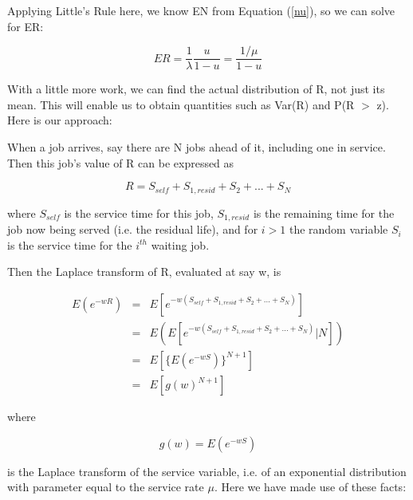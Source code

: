 Applying Little's Rule here, we know EN from Equation (\ref{nu}), so we
can solve for ER:

\begin{equation}
\label{meanres1}
ER = \frac{1}{\lambda} \frac{u}{1-u} = \frac{1/\mu}{1-u}
\end{equation}  

With a little more work, we can find the actual distribution of R, not
just its mean.  This will enable us to obtain quantities such as Var(R)
and P(R $>$ z).  Here is our approach:

When a job arrives, say there are N jobs ahead of it, including one in
service.  Then this job's value of R can be expressed as

\begin{equation}
\label{remaining}
R = S_{self} + S_{1,resid} + S_{2} + ... + S_{N}
\end{equation}

where $S_{self}$ is the service time for this job, $S_{1,resid}$ is the
remaining time for the job now being served (i.e. the residual life),
and for $i > 1$ the random variable $S_{i}$ is the service time for the
$i^{th}$ waiting job.

Then the Laplace transform of R, evaluated at say w, is

\begin{eqnarray}
\label{rlt}
E(e^{-wR}) &=& E[e^{-w(S_{self}+S_{1,resid}+S_{2}+...+S_{N})}] \\
&=& E \left ( 
E[e^{-w(S_{self}+S_{1,resid}+S_{2}+...+S_{N})} | N]
\right ) \\
&=& E[\{E(e^{-wS})\}^{N+1}] \\
&=& E[g(w)^{N+1}] \label{heyitsgeom}
\end{eqnarray}

where 

\begin{equation}
g(w) = E(e^{-wS})
\end{equation}

is the Laplace transform of the service variable, i.e. of an exponential
distribution with parameter equal to the service rate $\mu$.  Here we
have made use of these facts:

